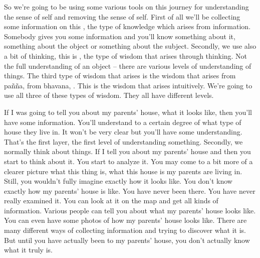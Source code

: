 \documentclass[letterpaper,10pt,english]{sphinxmanual}
\begin{document}
\sphinxAtStartPar
So  we’re  going  to  be  using  some  various  tools  on  this  journey  for
understanding the sense of self and removing the sense of self. First of all
we’ll be collecting some information on this
, the type of
knowledge which arises from information. Somebody gives you some information   and you’ll know something about it, something about the object or
something about the subject. Secondly, we use also a bit of thinking, this is
, the type of wisdom that arises through thinking. Not the
full understanding of an object – there are various levels of understanding of
things. The third type of wisdom that arises is the wisdom that arises from
pañña, from bhavana,
. This is the wisdom that arises
intuitively. We’re going to use all three of these types of wisdom. They all
have different levels.

\sphinxAtStartPar
If I was going to tell you about my parents’ house, what it looks like,
then  you’ll  have  some  information. You’ll  understand  to  a  certain  degree
of  what  type  of  house  they  live  in.  It  won’t  be  very  clear  but  you’ll  have
some  understanding. That’s  the  first  layer,  the  first  level  of  understanding
something. Secondly, we normally think about things. If I tell you about my
parents’ house and then you start to think about it. You start to analyze it.
You may come to a bit more of a clearer picture what this thing is, what this
house is my parents are living in. Still, you wouldn’t fully imagine exactly
how  it  looks  like. You  don’t  know  exactly  how  my  parents’  house  is  like.
You have never been there. You have never really examined it. You can look
at it on the map and get all kinds of information. Various people can tell you
about what my parents’ house looks like. You can even have some photos of
how my parents’ house looks like. There are many different ways of collecting information and trying to discover what it is. But until you have actually
been to my parents’ house, you don’t actually know what it truly is.
\end{document}
